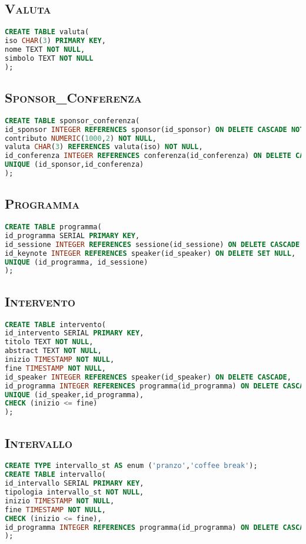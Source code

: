 \subsection{\textsc{Valuta}}
\begin{lstlisting}[language=SQL,style=mystyle,caption={Tabella: Valuta}]
CREATE TABLE valuta(
iso CHAR(3) PRIMARY KEY,
nome TEXT NOT NULL,
simbolo TEXT NOT NULL
);
\end{lstlisting}
\subsection{\textsc{Sponsor\_Conferenza}}
\begin{lstlisting}[language=SQL,style=mystyle, caption={Tabella: Sponsor\_Conferenza}]
CREATE TABLE sponsor_conferenza(
id_sponsor INTEGER REFERENCES sponsor(id_sponsor) ON DELETE CASCADE NOT NULL,
contributo NUMERIC(1000,2) NOT NULL,
valuta CHAR(3) REFERENCES valuta(iso) NOT NULL,
id_conferenza INTEGER REFERENCES conferenza(id_conferenza) ON DELETE CASCADE NOT NULL,
UNIQUE (id_sponsor,id_conferenza) 
);
\end{lstlisting}
\subsection{\textsc{Programma}}
\begin{lstlisting}[language=SQL,style=mystyle,caption={Tabella: Programma}]
CREATE TABLE programma(
id_programma SERIAL PRIMARY KEY,
id_sessione INTEGER REFERENCES sessione(id_sessione) ON DELETE CASCADE NOT NULL,
id_keynote INTEGER REFERENCES speaker(id_speaker) ON DELETE SET NULL,
UNIQUE (id_programma, id_sessione)
);

\end{lstlisting}
\subsection{\textsc{Intervento}}
\begin{lstlisting}[language=SQL,style=mystyle, caption={Tabella: Intervento}]
CREATE TABLE intervento(
id_intervento SERIAL PRIMARY KEY,
titolo TEXT NOT NULL,
abstract TEXT NOT NULL,
inizio TIMESTAMP NOT NULL,
fine TIMESTAMP NOT NULL,
id_speaker INTEGER REFERENCES speaker(id_speaker) ON DELETE CASCADE,
id_programma INTEGER REFERENCES programma(id_programma) ON DELETE CASCADE NOT NULL,
UNIQUE (id_speaker,id_programma), 
CHECK (inizio <= fine) 
);
\end{lstlisting}
\subsection{\textsc{Intervallo}}
\begin{lstlisting}[language=SQL,style=mystyle, caption={Tabella: Programma}]
CREATE TYPE intervallo_st AS enum ('pranzo','coffee break');
CREATE TABLE intervallo(
id_intervallo SERIAL PRIMARY KEY,
tipologia intervallo_st NOT NULL,
inizio TIMESTAMP NOT NULL,
fine TIMESTAMP NOT NULL,
CHECK (inizio <= fine), 
id_programma INTEGER REFERENCES programma(id_programma) ON DELETE CASCADE NOT NULL
);
\end{lstlisting}
